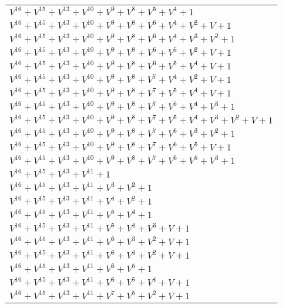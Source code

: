 \documentclass[12pt]{article}
\begin{document}
\begin{adjustwidth}{-4cm}{}
\begin{center}
\begin{longtable}{|l|}
$V^{16}  +V^{15}  +V^{13}  +V^{10}  +V^{9}  +V^{8}  +V^{5}  +V^{4}  + 1$ \\
$V^{16}  +V^{15}  +V^{13}  +V^{10}  +V^{9}  +V^{8}  +V^{6}  +V^{4}  +V^{2}  + V + 1$ \\
$V^{16}  +V^{15}  +V^{13}  +V^{10}  +V^{9}  +V^{8}  +V^{6}  +V^{4}  +V^{3}  +V^{2}  + 1$ \\
$V^{16}  +V^{15}  +V^{13}  +V^{10}  +V^{9}  +V^{8}  +V^{6}  +V^{5}  +V^{2}  + V + 1$ \\
$V^{16}  +V^{15}  +V^{13}  +V^{10}  +V^{9}  +V^{8}  +V^{6}  +V^{5}  +V^{4}  + V + 1$ \\
$V^{16}  +V^{15}  +V^{13}  +V^{10}  +V^{9}  +V^{8}  +V^{7}  +V^{4}  +V^{2}  + V + 1$ \\
$V^{16}  +V^{15}  +V^{13}  +V^{10}  +V^{9}  +V^{8}  +V^{7}  +V^{5}  +V^{4}  + V + 1$ \\
$V^{16}  +V^{15}  +V^{13}  +V^{10}  +V^{9}  +V^{8}  +V^{7}  +V^{5}  +V^{4}  +V^{3}  + 1$ \\
$V^{16}  +V^{15}  +V^{13}  +V^{10}  +V^{9}  +V^{8}  +V^{7}  +V^{5}  +V^{4}  +V^{3}  +V^{2}  + V + 1$ \\
$V^{16}  +V^{15}  +V^{13}  +V^{10}  +V^{9}  +V^{8}  +V^{7}  +V^{6}  +V^{3}  +V^{2}  + 1$ \\
$V^{16}  +V^{15}  +V^{13}  +V^{10}  +V^{9}  +V^{8}  +V^{7}  +V^{6}  +V^{5}  + V + 1$ \\
$V^{16}  +V^{15}  +V^{13}  +V^{10}  +V^{9}  +V^{8}  +V^{7}  +V^{6}  +V^{5}  +V^{3}  + 1$ \\
$V^{16}  +V^{15}  +V^{13}  +V^{11}  + 1$ \\
$V^{16}  +V^{15}  +V^{13}  +V^{11}  +V^{3}  +V^{2}  + 1$ \\
$V^{16}  +V^{15}  +V^{13}  +V^{11}  +V^{4}  +V^{2}  + 1$ \\
$V^{16}  +V^{15}  +V^{13}  +V^{11}  +V^{5}  +V^{4}  + 1$ \\
$V^{16}  +V^{15}  +V^{13}  +V^{11}  +V^{5}  +V^{4}  +V^{3}  + V + 1$ \\
$V^{16}  +V^{15}  +V^{13}  +V^{11}  +V^{6}  +V^{3}  +V^{2}  + V + 1$ \\
$V^{16}  +V^{15}  +V^{13}  +V^{11}  +V^{6}  +V^{4}  +V^{2}  + V + 1$ \\
$V^{16}  +V^{15}  +V^{13}  +V^{11}  +V^{6}  +V^{5}  + 1$ \\
$V^{16}  +V^{15}  +V^{13}  +V^{11}  +V^{6}  +V^{5}  +V^{4}  + V + 1$ \\
$V^{16}  +V^{15}  +V^{13}  +V^{11}  +V^{7}  +V^{5}  +V^{2}  + V + 1$ \\

\end{longtable}
\end{center}
\end{adjustwidth}
\end{document}
